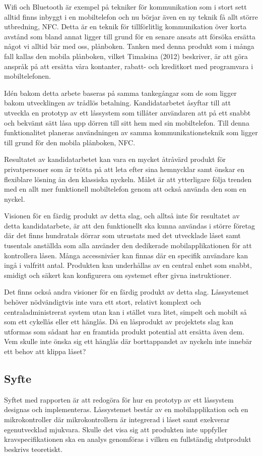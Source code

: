\documentclass[11pt]{article}
\begin{document}
Wifi och Bluetooth är exempel på tekniker för kommunikation som i stort sett alltid finns inbyggt i en mobiltelefon och nu börjar även en ny teknik få allt större utbredning, NFC. Detta är en teknik för tillförlitlig kommunikation över korta avstånd som bland annat ligger till grund för en senare ansats att försöka ersätta något vi alltid bär med oss, plånboken. Tanken med denna produkt som i många fall kallas den mobila plånboken, vilket Timalsina (2012) beskriver, är att göra anspråk på att ersätta våra kontanter, rabatt- och kreditkort med programvara i mobiltelefonen.

Idén bakom detta arbete baseras på samma tankegångar som de som ligger bakom utvecklingen av trådlös betalning. Kandidatarbetet åsyftar till att utveckla en prototyp av ett låssystem som tillåter användaren att på ett snabbt och bekvämt sätt låsa upp dörren till sitt hem med sin mobiltelefon. Till denna funktionalitet planeras användningen av samma kommunikationsteknik som ligger till grund för den mobila plånboken, NFC.

Resultatet av kandidatarbetet kan vara en mycket åtråvärd produkt för privatpersoner som är trötta på att leta efter sina hemnycklar samt önskar en flexiblare lösning än den klassiska nyckeln. Målet är att ytterligare följa trenden med en allt mer funktionell mobiltelefon genom att också använda den som en nyckel.

Visionen för en färdig produkt av detta slag, och alltså inte för resultatet av detta kandidatarbete, är att den funktionellt ska kunna användas i större företag där det finns hundratals dörrar som utrustats med det utvecklade låset samt tusentals anställda som alla använder den dedikerade mobilapplikationen för att kontrollera låsen. Många accessnivåer kan finnas där en specifik användare kan ingå i valfritt antal. Produkten kan underhållas av en central enhet som snabbt, smidigt och säkert kan konfigurera om systemet efter givna instruktioner.

Det finns också andra visioner för en färdig produkt av detta slag. Låssystemet behöver nödvändigtvis inte vara ett stort, relativt komplext och centraladministrerat system utan kan i stället vara litet, simpelt och mobilt så som ett cykellås eller ett hänglås. Då en låsprodukt av projektets slag kan utformas som sådant har en framtida produkt potential att ersätta även dem. Vem skulle inte önska sig ett hänglås där borttappandet av nyckeln inte innebär ett behov att klippa låset?


\subsection{Syfte}
Syftet med rapporten är att redogöra för hur en prototyp av ett låssystem designas och implementeras. Låssystemet består av en mobilapplikation och en mikrokontroller där mikrokontrollern är integrerad i låset samt exekverar egenutvecklad mjukvara. Skulle det visa sig att produkten inte uppfyller kravspecifikationen ska en analys genomföras i vilken en fullständig slutprodukt beskrivs teoretiskt.
\end{document}
